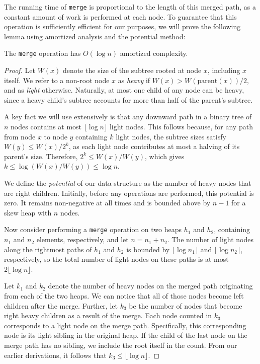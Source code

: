 The running time of \texttt{merge} is proportional to the length of this merged path, as a constant amount of work is performed at each node. To guarantee that this operation is sufficiently efficient for our purposes, we will prove the following lemma using amortized analysis and the potential method:

\begin{lemma}
The \texttt{merge} operation has \(O(\log n)\) amortized complexity.
\end{lemma}

\begin{proof}
Let \( W(x) \) denote the size of the subtree rooted at node \(x\), including \(x\) itself. We refer to a non-root node \(x\) as \emph{heavy} if \( W(x) > W(\mathrm{parent}(x))/2\), and as \emph{light} otherwise. Naturally, at most one child of any node can be heavy, since a heavy child's subtree accounts for more than half of the parent's subtree. 

A key fact we will use extensively is that any downward path in a binary tree of \(n\) nodes contains at most \(\lfloor \log n \rfloor\) light nodes. This follows because, for any path from node \(x\) to node \(y\) containing \(k\) light nodes, the subtree sizes satisfy \(W(y) \leq W(x) / 2^k\), as each light node contributes at most a halving of its parent's size. Therefore, \(2^k \leq W(x) / W(y)\), which gives \(k \leq \log(W(x)/W(y)) \leq \log n\).

We define the \emph{potential} of our data structure as the number of heavy nodes that are right children. Initially, before any operations are performed, this potential is zero. It remains non-negative at all times and is bounded above by \(n - 1\) for a skew heap with \(n\) nodes.

Now consider performing a \texttt{merge} operation on two heaps \(h_1\) and \(h_2\), containing \(n_1\) and \(n_2\) elements, respectively, and let \(n = n_1 + n_2\). The number of light nodes along the rightmost paths of \(h_1\) and \(h_2\) is bounded by \(\lfloor \log n_1 \rfloor\) and \(\lfloor \log n_2 \rfloor\), respectively, so the total number of light nodes on these paths is at most \(2 \lfloor \log n \rfloor\).

Let \(k_1\) and \(k_2\) denote the number of heavy nodes on the merged path originating from each of the two heaps. We can notice that all of those nodes become left children after the merge. Further, let \(k_3\) be the number of nodes that become right heavy children as a result of the merge. Each node counted in \(k_3\) corresponds to a light node on the merge path. Specifically, this corresponding node is its light sibling in the original heap. If the child of the last node on the merge path has no sibling, we include the root itself in the count. From our earlier derivations, it follows that \(k_3 \leq \lfloor \log n \rfloor\).


\end{proof}
